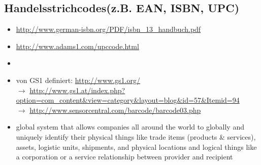 \subsection*{Handelsstrichcodes(z.B. EAN, ISBN, UPC)}
\begin{itemize}
	\item \url{http://www.german-isbn.org/PDF/isbn_13_handbuch.pdf}
	\item \url{http://www.adams1.com/upccode.html}
	\item 
	\item von GS1 definiert: \url{http://www.gs1.org/}\\
	$\to$ \url{http://www.gs1.at/index.php?option=com_content&view=category&layout=blog&id=57&Itemid=94}\\
	$\to$ \url{http://www.sensorcentral.com/barcode/barcode03.php}
	\item global system that allows companies all around the world to globally and uniquely identify their physical things like trade items (products \& services), assets, logistic units, shipments, and physical locations and logical things like a corporation or a service relationship between provider and recipient
\end{itemize}
